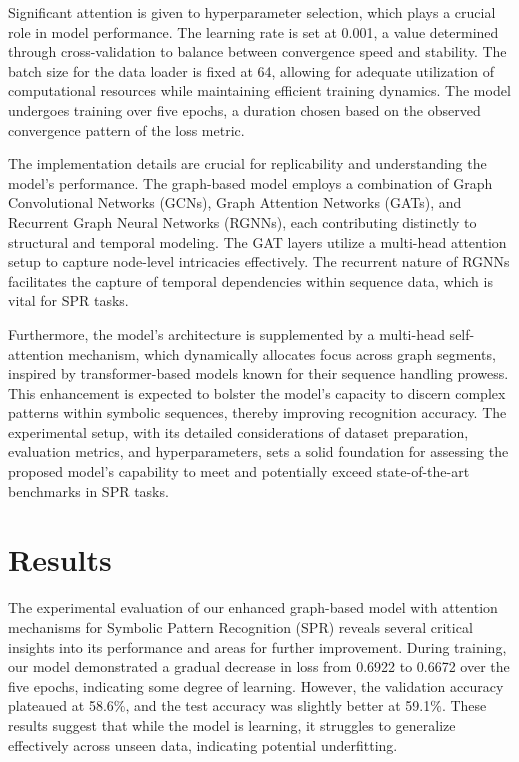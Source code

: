 \documentclass{article}
\begin{document}
Significant attention is given to hyperparameter selection, which plays a crucial role in model performance. The learning rate is set at 0.001, a value determined through cross-validation to balance between convergence speed and stability. The batch size for the data loader is fixed at 64, allowing for adequate utilization of computational resources while maintaining efficient training dynamics. The model undergoes training over five epochs, a duration chosen based on the observed convergence pattern of the loss metric.

The implementation details are crucial for replicability and understanding the model's performance. The graph-based model employs a combination of Graph Convolutional Networks (GCNs), Graph Attention Networks (GATs), and Recurrent Graph Neural Networks (RGNNs), each contributing distinctly to structural and temporal modeling. The GAT layers utilize a multi-head attention setup to capture node-level intricacies effectively. The recurrent nature of RGNNs facilitates the capture of temporal dependencies within sequence data, which is vital for SPR tasks.

Furthermore, the model's architecture is supplemented by a multi-head self-attention mechanism, which dynamically allocates focus across graph segments, inspired by transformer-based models known for their sequence handling prowess. This enhancement is expected to bolster the model’s capacity to discern complex patterns within symbolic sequences, thereby improving recognition accuracy. The experimental setup, with its detailed considerations of dataset preparation, evaluation metrics, and hyperparameters, sets a solid foundation for assessing the proposed model's capability to meet and potentially exceed state-of-the-art benchmarks in SPR tasks.

\section{Results}
The experimental evaluation of our enhanced graph-based model with attention mechanisms for Symbolic Pattern Recognition (SPR) reveals several critical insights into its performance and areas for further improvement. During training, our model demonstrated a gradual decrease in loss from 0.6922 to 0.6672 over the five epochs, indicating some degree of learning. However, the validation accuracy plateaued at 58.6\%, and the test accuracy was slightly better at 59.1\%. These results suggest that while the model is learning, it struggles to generalize effectively across unseen data, indicating potential underfitting.
\end{document}
